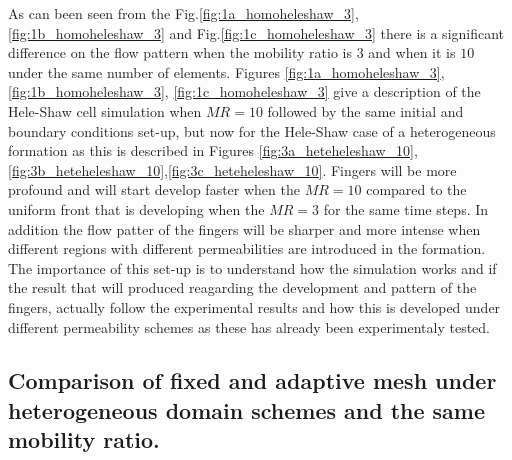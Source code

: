 \documentclass[preprint,authoryear,12pt]{elsarticle}
\begin{document}
\medskip
As can been seen from the Fig.\ref{fig:1a_homoheleshaw_3},\ref{fig:1b_homoheleshaw_3} and Fig.\ref{fig:1c_homoheleshaw_3} there is a significant difference on the flow pattern when the mobility ratio is $3$ and when it is $10$ under the same number of elements. Figures \ref{fig:1a_homoheleshaw_3}, \ref{fig:1b_homoheleshaw_3}, \ref{fig:1c_homoheleshaw_3} give a description of the Hele-Shaw cell simulation when $MR=10$ followed by the same initial and boundary conditions set-up, but now for the Hele-Shaw case of a heterogeneous formation as this is described in Figures \ref{fig:3a_heteheleshaw_10},\ref{fig:3b_heteheleshaw_10},\ref{fig:3c_heteheleshaw_10}. Fingers will be more profound and will start develop faster when the $MR=10$ compared to the uniform front that is developing when the $MR=3$ for the same time steps. In addition the flow patter of the fingers will be sharper and more intense when different regions with different permeabilities are introduced in the formation. The importance of this set-up is to understand how the simulation works and if the result that will produced reagarding the development and pattern of the fingers, actually follow the experimental results  and how this is developed under different permeability schemes as these has already been experimentaly tested.  



\subsection{Comparison of fixed and adaptive mesh under heterogeneous domain schemes and the same mobility ratio.}
\end{document}
